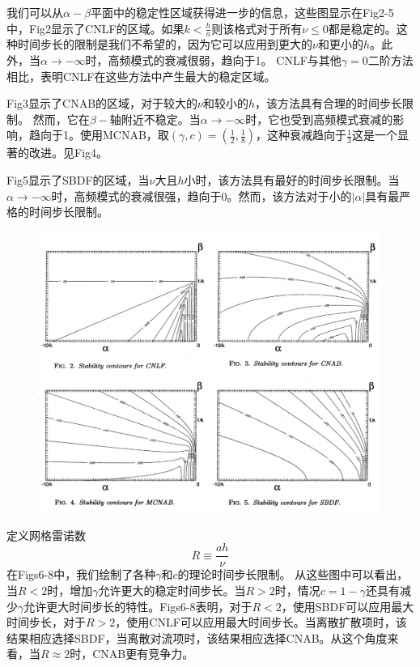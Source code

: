 \documentclass[12pt,a4paper]{article}
\begin{document}
我们可以从$\alpha-\beta$平面中的稳定性区域获得进一步的信息，这些图显示在Fig2-5中，Fig2显示了CNLF的区域。如果$k<\frac{h}{a}$则该格式对于所有$\nu\le 0$都是稳定的。这种时间步长的限制是我们不希望的，因为它可以应用到更大的$\nu$和更小的$h$。此外，当$\alpha\rightarrow-\infty$时，高频模式的衰减很弱，趋向于1。 CNLF与其他$\gamma=0$二阶方法相比，表明CNLF在这些方法中产生最大的稳定区域。

Fig3显示了CNAB的区域，对于较大的$\nu$和较小的$h$，该方法具有合理的时间步长限制。 然而，它在$\beta-$轴附近不稳定。当$\alpha\rightarrow-\infty$时，它也受到高频模式衰减的影响，趋向于1。使用MCNAB，取$(\gamma,c)=(\frac{1}{2},\frac{1}{8})$，这种衰减趋向于$\frac{1}{3}$这是一个显著的改进。见Fig4。

Fig5显示了SBDF的区域，当$\nu$大且$h$小时，该方法具有最好的时间步长限制。当$\alpha\rightarrow-\infty$时，高频模式的衰减很强，趋向于0。然而，该方法对于小的$|\alpha|$具有最严格的时间步长限制。
\begin{figure}[H]
\centering
\includegraphics[scale=0.4]{./figures/Figure_1.png}
\end{figure}
定义网格雷诺数
\begin{equation*}
R\equiv\frac{ah}{\nu}
\end{equation*}
在Figs6-8中，我们绘制了各种$\gamma$和$c$的理论时间步长限制。 从这些图中可以看出，当$R<2$时，增加$\gamma$允许更大的稳定时间步长。当$R>2$时，情况$c=1-\gamma$还具有减少$\gamma$允许更大时间步长的特性。Figs6-8表明，对于$R<2$，使用SBDF可以应用最大时间步长，对于$R>2$，使用CNLF可以应用最大时间步长。当离散扩散项时，该结果相应选择SBDF，当离散对流项时，该结果相应选择CNAB。从这个角度来看，当$R\approx 2$时，CNAB更有竞争力。
\end{document}
